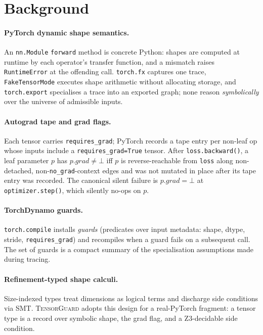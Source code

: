 \section{Background}\label{sec:background}

\paragraph{PyTorch dynamic shape semantics.} An
\texttt{nn.Module} \texttt{forward} method is concrete Python:
shapes are computed at runtime by each operator's transfer
function, and a mismatch raises \texttt{RuntimeError} at the
offending call. \texttt{torch.fx} captures one trace,
\texttt{FakeTensorMode} executes shape arithmetic without
allocating storage, and \texttt{torch.export} specialises a
trace into an exported graph; none reason \emph{symbolically}
over the universe of admissible inputs.

\paragraph{Autograd tape and grad flags.} Each tensor carries
\texttt{requires\_grad}; PyTorch records a tape entry per
non-leaf op whose inputs include a \texttt{requires\_grad=True}
tensor. After \texttt{loss.backward()}, a leaf parameter $p$
has $p.\mathit{grad}\neq\bot$ iff $p$ is reverse-reachable from
\texttt{loss} along non-detached, non-\texttt{no\_grad}-context
edges and was not mutated in place after its tape entry was
recorded. The canonical silent failure is $p.\mathit{grad}=\bot$
at \texttt{optimizer.step()}, which silently no-ops on $p$.

\paragraph{TorchDynamo guards.} \texttt{torch.compile} installs
\emph{guards} (predicates over input metadata: shape, dtype,
stride, \texttt{requires\_grad}) and recompiles when a guard
fails on a subsequent call. The set of guards is a compact
summary of the specialisation assumptions made during tracing.

\paragraph{Refinement-typed shape calculi.} Size-indexed types
\citep{xi1998dependent,vazou2014liquid} treat dimensions as
logical terms and discharge side conditions via SMT.
\textsc{TensorGuard} adopts this design for a real-PyTorch
fragment: a tensor type is a record over symbolic shape, the
grad flag, and a Z3-decidable side condition.
